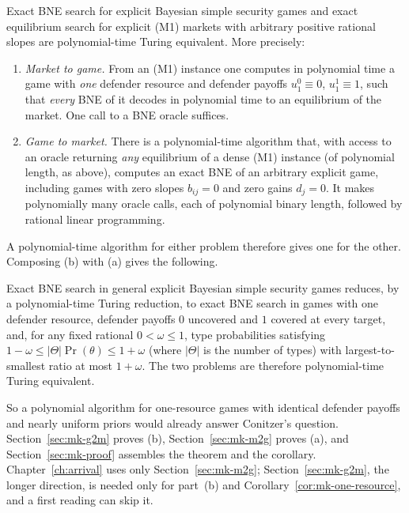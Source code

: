 \begin{theorem}\label{thm:mk-main}
\statusrefereed
Exact BNE search for explicit Bayesian simple security games and exact equilibrium search for
explicit (M1) markets with arbitrary positive rational slopes are polynomial-time Turing equivalent.
More precisely:
\begin{enumerate}[nosep,label=(\alph*)]
\item \emph{Market to game.} From an (M1) instance one computes in polynomial time a game with
\emph{one} defender resource and defender payoffs $u_1^0\equiv0$, $u_1^1\equiv1$, such that \emph{every}
BNE of it decodes in polynomial time to an equilibrium of the market. One call to a BNE oracle
suffices.
\item \emph{Game to market.} There is a polynomial-time algorithm that, with access to an oracle
returning \emph{any} equilibrium of a dense (M1) instance (of polynomial length, as above), computes an
exact BNE of an arbitrary explicit game, including games with zero slopes $b_{ij}=0$ and zero gains
$d_j=0$. It makes polynomially many oracle calls, each of polynomial binary length, followed by
rational linear programming.
\end{enumerate}
\end{theorem}

A polynomial-time algorithm for either problem therefore gives one for the other. Composing (b) with
(a) gives the following.

\begin{corollary}\label{cor:mk-one-resource}
\statusrefereed
Exact BNE search in general explicit Bayesian simple security games reduces, by a polynomial-time
Turing reduction, to exact BNE search in games with one defender resource, defender payoffs $0$
uncovered and $1$ covered at every target, and, for any fixed rational $0<\omega\le1$, type
probabilities satisfying $1-\omega\le|\Theta|\Pr(\theta)\le1+\omega$ (where $|\Theta|$ is the number of types)
with largest-to-smallest ratio at most $1+\omega$. The two problems are therefore polynomial-time
Turing equivalent.
\end{corollary}

So a polynomial algorithm for one-resource games with identical defender payoffs and nearly uniform
priors would already answer Conitzer's question. Section~\ref{sec:mk-g2m} proves (b),
Section~\ref{sec:mk-m2g} proves (a), and Section~\ref{sec:mk-proof} assembles the theorem and the
corollary. Chapter~\ref{ch:arrival} uses only Section~\ref{sec:mk-m2g}; Section~\ref{sec:mk-g2m}, the longer direction, is needed only for part~(b) and Corollary~\ref{cor:mk-one-resource}, and a first reading can skip it. 


